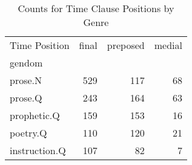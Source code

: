 \begin{table}[htbp!]
\centering
\caption{Counts for Time Clause Positions by Genre}
\label{table:posig_ct}
\begin{tabular}{lrrr}
\toprule
Time Position &  final &  preposed &  medial \\
gendom        &        &           &         \\
\midrule
prose.N       &    529 &       117 &      68 \\
prose.Q       &    243 &       164 &      63 \\
prophetic.Q   &    159 &       153 &      16 \\
poetry.Q      &    110 &       120 &      21 \\
instruction.Q &    107 &        82 &       7 \\
\bottomrule
\end{tabular}
\end{table}
